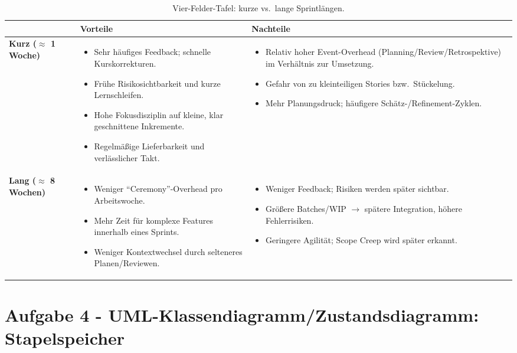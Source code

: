 \documentclass[12pt]{article}
\begin{document}
\begin{table}[h]
\centering
\renewcommand{\arraystretch}{1.15}
\begin{tabularx}{\textwidth}{@{} l Y Y @{}}
\toprule
& \textbf{Vorteile} & \textbf{Nachteile} \\
\midrule
\textbf{Kurz (\(\approx\) 1 Woche)} &
\begin{itemize}[leftmargin=*]
  \item Sehr häufiges Feedback; schnelle Kurskorrekturen.
  \item Frühe Risikosichtbarkeit und kurze Lernschleifen.
  \item Hohe Fokusdisziplin auf kleine, klar geschnittene Inkremente.
  \item Regelmäßige Lieferbarkeit und verlässlicher Takt.
\end{itemize}
&
\begin{itemize}[leftmargin=*]
  \item Relativ hoher Event-Overhead (Planning/Review/Retrospektive) im Verhältnis zur Umsetzung.
  \item Gefahr von zu kleinteiligen Stories bzw.\ Stückelung.
  \item Mehr Planungsdruck; häufigere Schätz-/Refinement-Zyklen.
\end{itemize}
\\
\midrule
\textbf{Lang (\(\approx\) 8 Wochen)} &
\begin{itemize}[leftmargin=*]
  \item Weniger \enquote{Ceremony}-Overhead pro Arbeitswoche.
  \item Mehr Zeit für komplexe Features innerhalb eines Sprints.
  \item Weniger Kontextwechsel durch selteneres Planen/Reviewen.
\end{itemize}
&
\begin{itemize}[leftmargin=*]
  \item Weniger Feedback; Risiken werden später sichtbar.
  \item Größere Batches/WIP $\rightarrow$ spätere Integration, höhere Fehlerrisiken.
  \item Geringere Agilität; Scope Creep wird später erkannt.
\end{itemize}
\\
\bottomrule
\end{tabularx}
\caption{Vier-Felder-Tafel: kurze vs.\ lange Sprintlängen.}
\end{table}

\section*{Aufgabe 4 - UML-Klassendiagramm/Zustandsdiagramm: Stapelspeicher}
\end{document}
